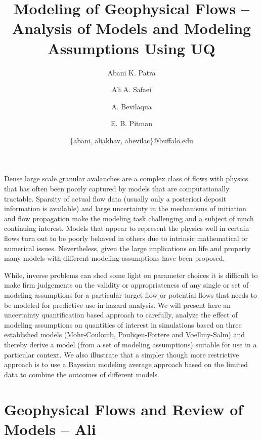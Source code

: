 \documentclass{article}
\begin{document}
\title{\bf Modeling of Geophysical Flows -- Analysis of Models and Modeling Assumptions Using UQ}
\author[1,2]{Abani K. Patra}
\author[2]{ Ali A. Safaei}
\author[3]{A. Bevilaqua}
\author[4]{E. B. Pitman}


\date{\{abani, aliakhav, abevilac\}@buffalo.edu}


\maketitle

\abstract
Dense large scale granular avalanches are a complex class of flows with physics that has often been poorly captured by models that are computationally tractable. Sparsity of actual flow data (usually only a posteriori  deposit information is available) and large uncertainty in the mechanisms of initiation and flow propagation make the modeling task challenging and a 
subject of much continuing interest. Models that appear to represent the physics well
 in certain flows turn out to be poorly behaved in others due to intrinsic mathematical or numerical issues.  
Nevertheless, given the large implications on life and property many models with different modeling assumptions have been proposed. 

While, inverse problems can shed some light on parameter choices it is difficult to make firm judgements on the validity or appropriateness of any single or set of modeling assumptions for a particular target flow or potential flows that needs to be modeled for predictive use in hazard analysis. We will present here an uncertainty quantification  based approach to carefully, analyze the effect of modeling assumptions on quantities of 
interest in simulations based on three established models (Mohr-Coulomb, Pouliqen-Fortere and Voellmy-Salm) and thereby derive a model (from a set of modeling assumptions) suitable for use in a particular context. We also illustrate that a simpler though more restrictive approach is to use a Bayesian modeling average approach based on the limited data to combine the outcomes of different models.
\newpage
\section{Geophysical Flows and Review of Models -- Ali}
\end{document}
